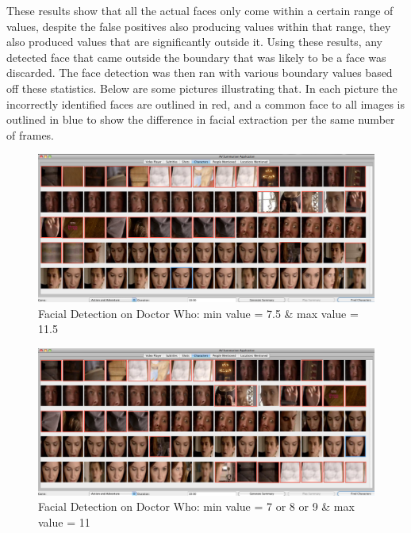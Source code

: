 These results show that all the actual faces only come within a certain range of values, despite the false positives also producing values within that range, they also produced
values that are significantly outside it. Using these results, any detected face that came outside the boundary that was likely to be a face was discarded. The 
face detection was then ran with various boundary values based off these statistics. Below are some pictures illustrating that. In each picture the 
incorrectly identified faces are outlined in red, and a common face to all images is outlined in blue to show the difference in facial extraction per 
the same number of frames. 

\begin{figure}[h1]
\begin{center}
 \includegraphics[trim = 0mm 0mm 0mm 0mm, clip,
 scale=0.19]{Images/sevenpointfivetoelevenpointfive.png}
  \caption{Facial Detection on Doctor Who: min value = 7.5 \& max value = 11.5}
 \end{center}
\end{figure}

\begin{figure}[h1]
\begin{center}
 \includegraphics[trim = 0mm 0mm 0mm 0mm, clip,
 scale=0.19]{Images/seveneightninetoeleven.png}
  \caption{Facial Detection on Doctor Who: min value = 7 or 8 or 9 \& max value = 11}
 \end{center}
\end{figure}


